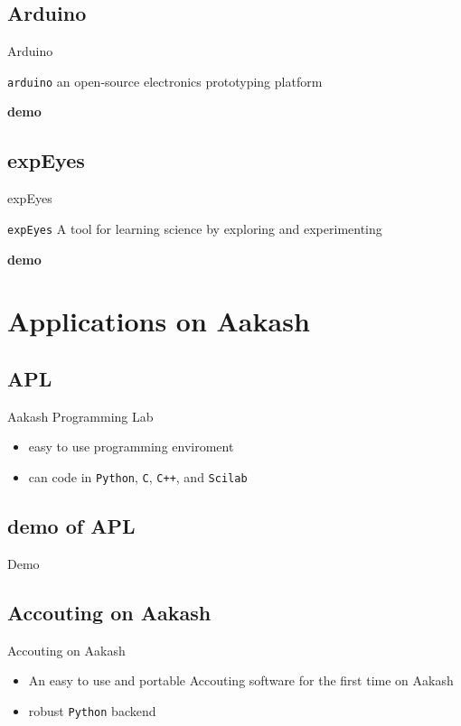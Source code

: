 \documentclass{beamer}
\begin{document}
\subsection{Arduino}
\begin{frame}{Arduino}
  \begin{block}{}
    {\tt arduino} an open-source electronics
    prototyping platform
    \end{block}
  \vskip 1cm
  \centerline {\bf demo}
\end{frame}

\subsection{expEyes}
\begin{frame}{expEyes}
  \begin{block}{}
    {\tt expEyes} A tool for learning science by exploring and experimenting
  \end{block}
  \vskip 1cm
  \centerline {\bf demo}
\end{frame}

\section{Applications on Aakash}
  \subsection{APL}
  \begin{frame}{Aakash Programming Lab}
    \begin{itemize}
      \item easy to use programming enviroment
      \item can code in {\tt Python}, {\tt C}, {\tt C++}, and {\tt Scilab}
    \end{itemize}
  \end{frame}

  \subsection{demo of APL}
  \begin{frame}{Demo}
    \begin{block}{}
    \end{block}
  \end{frame}

  \subsection{Accouting on Aakash}
  \begin{frame}{Accouting on Aakash}
    \begin{itemize}
      \item An easy to use and portable Accouting software for the
        first time on Aakash
      \item robust {\tt Python} backend
    \end{itemize}
  \end{frame}
\end{document}
